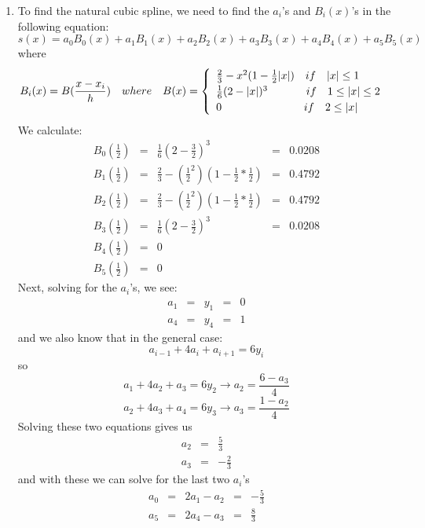\documentclass[11pt,a4paper]{article}
\begin{document}
\begin{itemize}
\begin{enumerate} [label={\alph*)}]
    				\item To find the natural cubic spline, we need to find the $a_i$'s and $B_i(x)$'s in the following equation:
    				$$s(x) = a_0B_0(x) + a_1B_1(x) + a_2B_2(x) + a_3B_3(x) + a_4B_4(x) + a_5B_5(x)$$
    				where 
    				$$B_i(x) = B(\frac{x-x_i}{h}) \quad where \quad B(x) = \begin{cases}
					\mkern9mu \frac{2}{3} - x^2(1-\frac{1}{2}\vert x \vert)\quad if \quad \vert x \vert \leq 1 \\
					\mkern9mu \frac{1}{6}(2-\vert x \vert)^3 \quad \quad \quad \mkern9mu  if \quad 1 \leq \vert x \vert \leq 2 \\
					\mkern9mu 0 \quad \quad \quad \quad \quad \quad \quad \mkern9mu  if \quad 2 \leq \vert x \vert
					\end{cases}$$
					We calculate:
					$$\begin{array}{ccccc}
					B_0(\frac{1}{2}) &=& \frac{1}{6}(2-\frac{3}{2})^3&=&0.0208\\
						B_1(\frac{1}{2}) &=& \frac{2}{3}-(\frac{1}{2}^2)(1-\frac{1}{2}*\frac{1}{2})&=&0.4792\\
						B_2(\frac{1}{2}) &=& \frac{2}{3}-(\frac{1}{2}^2)(1-\frac{1}{2}*\frac{1}{2})&=&0.4792\\
						B_3(\frac{1}{2}) &=& \frac{1}{6}(2-\frac{3}{2})^3&=&0.0208\\
						B_4(\frac{1}{2}) &=& 0&&\\
						B_5(\frac{1}{2}) &=& 0&&
					\end{array}$$
					Next, solving for the $a_i$'s, we see:
					$$\begin{array}{ccccc}
						a_1 & = & y_1 & = & 0\\
						a_4 & = & y_4 & = & 1
					\end{array}$$
					and we also know that in the general case:
					$$a_{i-1}+4a_i+a_{i+1}=6y_{i}$$
					so
					$$a_{1}+4a_{2}+a_{3}=6y_{2} \rightarrow a_2 = \frac{6-a_3}{4}$$
					$$a_{2}+4a_{3}+a_{4}=6y_{3} \rightarrow a_3 = \frac{1-a_2}{4}$$
					Solving these two equations gives us
					$$\begin{array}{ccc}
						a_2 & = & \frac{5}{3}\\
						a_3 & = & -\frac{2}{3}
					\end{array}$$
					and with these we can solve for the last two $a_i$'s
					$$\begin{array}{ccccc}
						a_0 & = & 2a_1 - a_2 & = & -\frac{5}{3}\\
						a_5 & = & 2a_4 - a_3 & = & \frac{8}{3}
					\end{array}$$

\end{enumerate}
\end{itemize}
\end{document}
